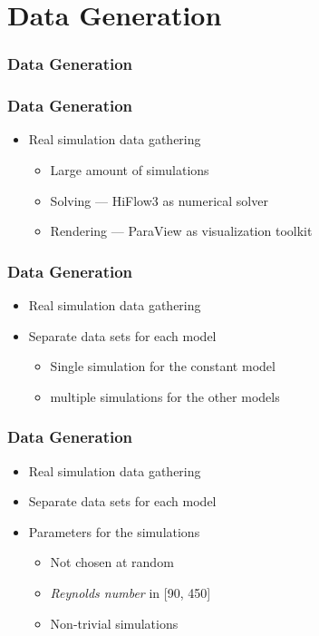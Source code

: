 \documentclass[18pt, xcolor=table]{beamer}
\begin{document}
\section{Data Generation}

\begin{frame}[t]
  \frametitle{Data Generation}
\end{frame}

\begin{frame}[t]
  \frametitle{Data Generation}
  \begin{itemize}
  \item Real simulation data gathering
    \begin{itemize}
    \item Large amount of simulations
    \item Solving --- HiFlow3 as numerical solver
    \item Rendering --- ParaView as visualization toolkit
    \end{itemize}
  \end{itemize}
\end{frame}


\begin{frame}[t]
  \frametitle{Data Generation}
  \begin{itemize}
  \item Real simulation data gathering
  \item Separate data sets for each model
    \begin{itemize}
    \item Single simulation for the constant model
    \item multiple simulations for the other models
    \end{itemize}
  \end{itemize}
\end{frame}

\begin{frame}[t]
  \frametitle{Data Generation}
  \begin{itemize}
  \item Real simulation data gathering
  \item Separate data sets for each model
  \item Parameters for the simulations
    \begin{itemize}
    \item Not chosen at random
    \item \textit{Reynolds number} in [90, 450]
    \item Non-trivial simulations
    \end{itemize}
  \end{itemize}
\end{frame}
\end{document}
